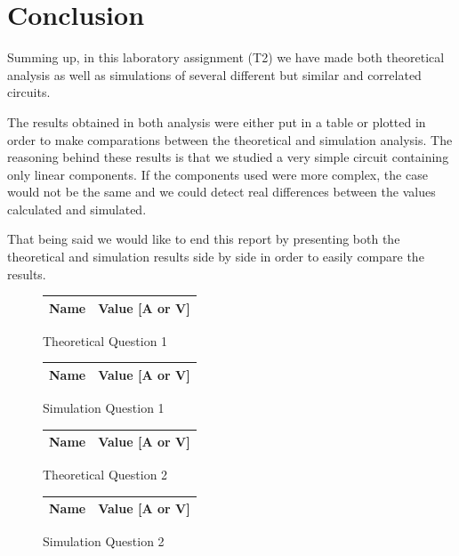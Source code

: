 \section{Conclusion}
\label{sec:conclusion}

Summing up, in this laboratory assignment (T2) we have made both theoretical analysis as well as simulations of several different but similar and correlated circuits. \par
The results obtained in both analysis were either put in a table or plotted in order to make comparations between the theoretical and simulation analysis.
The reasoning behind these results is that we studied a very simple circuit containing only linear components. If the components used were more complex, the case would not be the same and we could detect real differences between the values calculated and simulated. \par
That being said we would like to end this report by presenting both the theoretical and simulation results side by side in order to easily compare the results.


\begin{figure}[H]
      \centering
      \begin{tabular}{ | c | c | }
      \hline    
      {\bf Name} & {\bf Value [A or V]} \\ \hline
      
      \hline
      \end{tabular}
      \caption{Theoretical Question 1}
    \endminipage\hfill
      \centering
      \begin{tabular}{ | c | c | }
      \hline    
      {\bf Name} & {\bf Value [A or V]} \\ \hline
      
      \end{tabular}
      \caption{Simulation Question 1}
    \endminipage\hfill
\end{figure}

\begin{figure}[H]
      \centering
      \begin{tabular}{ | c | c | }
      \hline    
      {\bf Name} & {\bf Value [A or V]} \\ \hline
      
      \hline
      \end{tabular}
      \caption{Theoretical Question 2}
    \endminipage\hfill
      \centering
      \begin{tabular}{ | c | c | }
      \hline    
      {\bf Name} & {\bf Value [A or V]} \\ \hline
      
      \end{tabular}
      \caption{Simulation Question 2}
    \endminipage\hfill
\end{figure}

